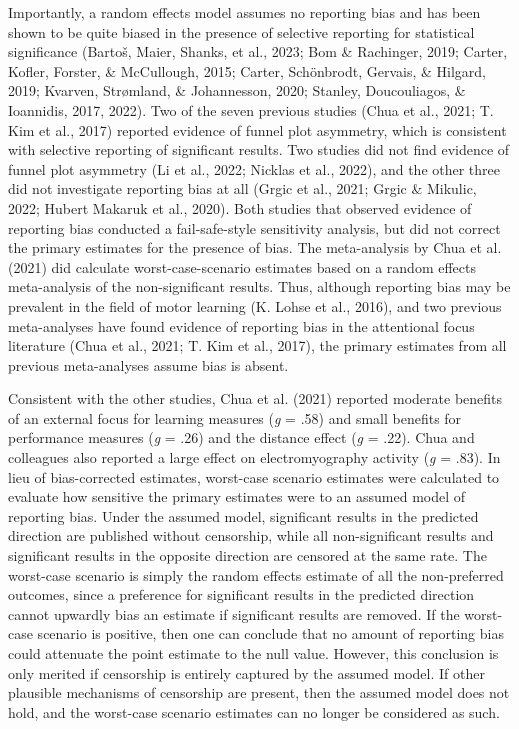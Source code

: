\documentclass[
  man, donotrepeattitle,floatsintext]{apa7}
\begin{document}
Importantly, a random effects model assumes no reporting bias and has been shown to be quite biased in the presence of selective reporting for statistical significance (Bartoš, Maier, Shanks, et al., 2023; Bom \& Rachinger, 2019; Carter, Kofler, Forster, \& McCullough, 2015; Carter, Schönbrodt, Gervais, \& Hilgard, 2019; Kvarven, Strømland, \& Johannesson, 2020; Stanley, Doucouliagos, \& Ioannidis, 2017, 2022). Two of the seven previous studies (Chua et al., 2021; T. Kim et al., 2017) reported evidence of funnel plot asymmetry, which is consistent with selective reporting of significant results. Two studies did not find evidence of funnel plot asymmetry (Li et al., 2022; Nicklas et al., 2022), and the other three did not investigate reporting bias at all (Grgic et al., 2021; Grgic \& Mikulic, 2022; Hubert Makaruk et al., 2020). Both studies that observed evidence of reporting bias conducted a fail-safe-style sensitivity analysis, but did not correct the primary estimates for the presence of bias. The meta-analysis by Chua et al. (2021) did calculate worst-case-scenario estimates based on a random effects meta-analysis of the non-significant results. Thus, although reporting bias may be prevalent in the field of motor learning (K. Lohse et al., 2016), and two previous meta-analyses have found evidence of reporting bias in the attentional focus literature (Chua et al., 2021; T. Kim et al., 2017), the primary estimates from all previous meta-analyses assume bias is absent.

Consistent with the other studies, Chua et al. (2021) reported moderate benefits of an external focus for learning measures (\emph{g} = .58) and small benefits for performance measures (\emph{g} = .26) and the distance effect (\emph{g} = .22). Chua and colleagues also reported a large effect on electromyography activity (\emph{g} = .83). In lieu of bias-corrected estimates, worst-case scenario estimates were calculated to evaluate how sensitive the primary estimates were to an assumed model of reporting bias. Under the assumed model, significant results in the predicted direction are published without censorship, while all non-significant results and significant results in the opposite direction are censored at the same rate. The worst-case scenario is simply the random effects estimate of all the non-preferred outcomes, since a preference for significant results in the predicted direction cannot upwardly bias an estimate if significant results are removed. If the worst-case scenario is positive, then one can conclude that no amount of reporting bias could attenuate the point estimate to the null value. However, this conclusion is only merited if censorship is entirely captured by the assumed model. If other plausible mechanisms of censorship are present, then the assumed model does not hold, and the worst-case scenario estimates can no longer be considered as such.
\end{document}
